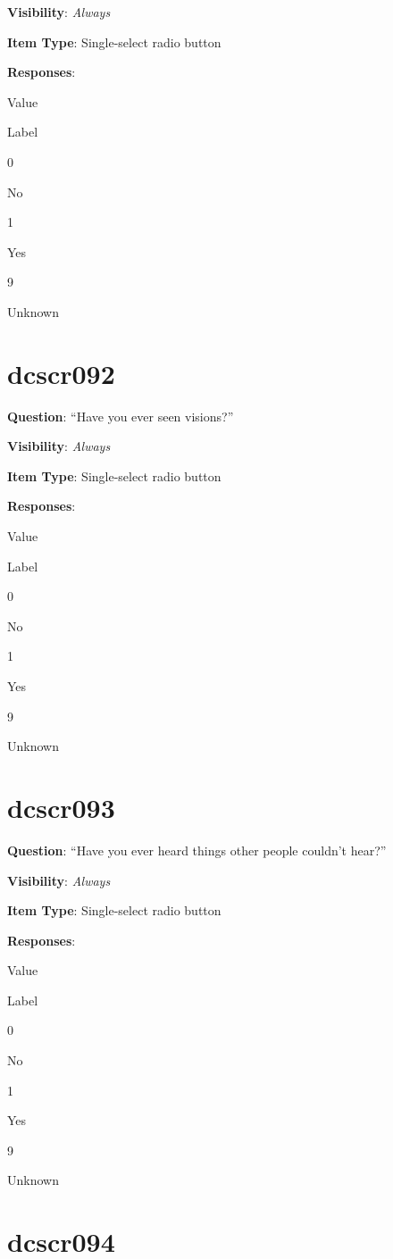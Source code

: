 \documentclass[]{book}
\begin{document}
\textbf{Visibility}: \emph{Always}

\textbf{Item Type}: Single-select radio button

\textbf{Responses}:

Value

Label

0

No

1

Yes

9

Unknown

\hypertarget{dcscr092}{%
\section{dcscr092}\label{dcscr092}}

\textbf{Question}: ``Have you ever seen visions?''

\textbf{Visibility}: \emph{Always}

\textbf{Item Type}: Single-select radio button

\textbf{Responses}:

Value

Label

0

No

1

Yes

9

Unknown

\hypertarget{dcscr093}{%
\section{dcscr093}\label{dcscr093}}

\textbf{Question}: ``Have you ever heard things other people couldn't hear?''

\textbf{Visibility}: \emph{Always}

\textbf{Item Type}: Single-select radio button

\textbf{Responses}:

Value

Label

0

No

1

Yes

9

Unknown

\hypertarget{dcscr094}{%
\section{dcscr094}\label{dcscr094}}
\end{document}
